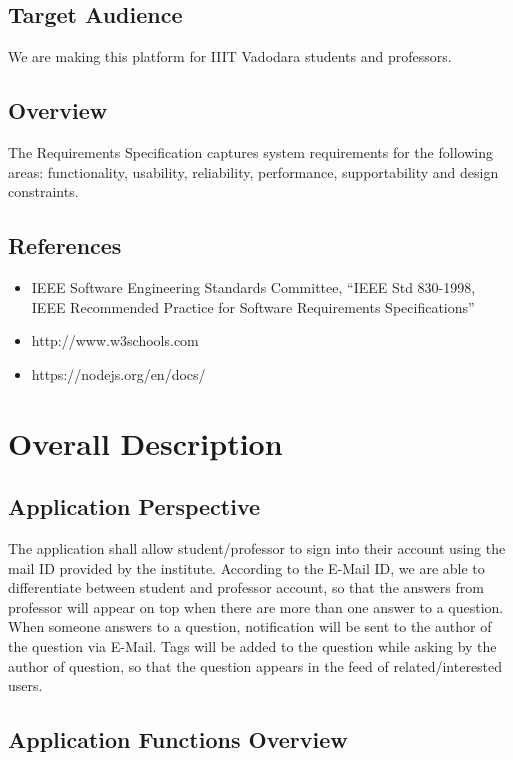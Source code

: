 \documentclass[12pt]{article}
\begin{document}
\subsection{Target Audience}
We are making this platform for IIIT Vadodara students and professors. 

\subsection{Overview}

The Requirements Specification captures system requirements for the following areas: functionality,
usability, reliability, performance, supportability and design constraints.

\subsection{References}
\begin{itemize}
\item IEEE Software Engineering Standards Committee, “IEEE Std 830-1998, IEEE Recommended Practice for Software Requirements Specifications”
\item http://www.w3schools.com
\item https://nodejs.org/en/docs/
\end{itemize}

\section{Overall Description}

\subsection{Application Perspective}
The application shall allow student/professor to sign into their account using the mail ID provided by the institute. According to the E-Mail ID, we are able to differentiate between student and professor account, so that the answers from professor will appear on top when there are more than one answer to a question. When someone answers to a question, notification will be sent to the author of the question via E-Mail. Tags will be added to the question while asking by the author of question, so that the question appears in the feed of related/interested users. 

\subsection{Application Functions Overview}
\end{document}
